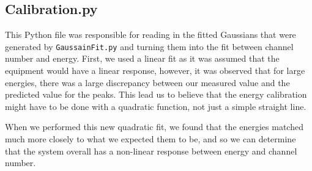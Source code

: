 \documentclass[11pt,a4paper]{article}
\begin{document}
\clearpage
\subsection{Calibration.py}

This Python file was responsible for reading in the fitted Gaussians that were generated by \texttt{GaussainFit.py} and turning them into the fit between channel number and energy. First, we used a linear fit as it was assumed that the equipment would have a linear response, however, it was observed that for large energies, there was a large discrepancy between our measured value and the predicted value for the peaks. This lead us to believe that the energy calibration might have to be done with a quadratic function, not just a simple straight line. 

When we performed this new quadratic fit, we found that the energies matched much more closely to what we expected them to be, and so we can determine that the system overall has a non-linear response between energy and channel number.
\end{document}
